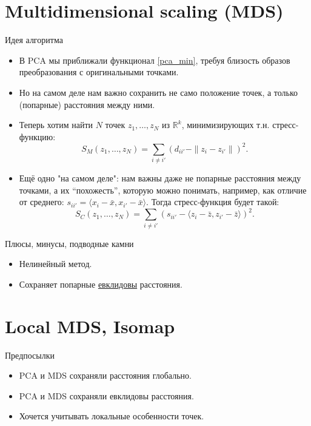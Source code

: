 \documentclass[9pt]{beamer}
\begin{document}
\section{Multidimensional scaling (MDS)}
\begin{frame}{Идея алгоритма}
\begin{itemize}
    \item В PCA мы приближали функционал \eqref{pca_min}, требуя  близость образов преобразования с оригинальными точками.
    \item Но на самом деле нам важно сохранить не само положение точек, а только (попарные) расстояния между ними.
    \item Теперь хотим найти $N$ точек $z_1, \ldots, z_N$ из $\mathbb R ^k$, минимизирующих т.н. стресс-функцию:
    \begin{equation}\label{mds_stress_funstion}
        S_M(z_1, \ldots, z_N) = \sum_{i\neq i'} (d_{ii'} - \|z_i - z_{i'}\|)^2.
    \end{equation}
    \item Ещё одно "на самом деле": нам важны даже не попарные расстояния между точками, а их ``похожесть'', которую можно понимать, например, как отличие от среднего: $s_{ii'}=\langle x_i - \bar x, x_{i'} - \bar x\rangle$. Тогда стресс-функция будет такой:
    $$S_C(z_1, \ldots, z_N) = \sum_{i\neq i'} (s_{ii'} - \langle z_i - \bar z, z_{i'} - \bar z\rangle)^2.$$
\end{itemize}
\end{frame}

\begin{frame}{Плюсы, минусы, подводные камни}
\begin{itemize}
    \item Нелинейный метод.
    \item Сохраняет попарные \underline{евклидовы} расстояния.
\end{itemize}
\end{frame}

\section{Local MDS, Isomap}
\begin{frame}{Предпосылки}
\begin{itemize}
    \item PCA и MDS сохраняли расстояния глобально.
    \item PCA и MDS сохраняли евклидовы расстояния.
    \item Хочется учитывать локальные особенности точек.
\end{itemize}
\end{frame}
\end{document}
